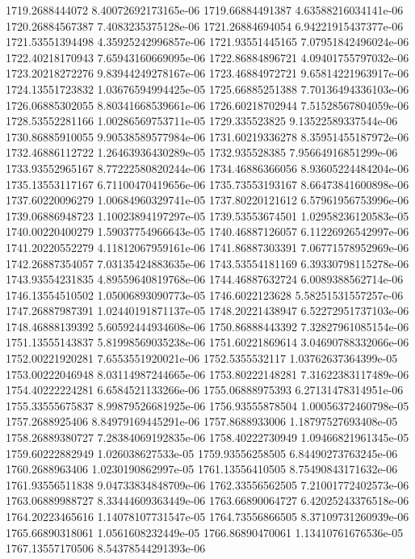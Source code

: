 {1719.2688444072 8.40072692173165e-06
1719.66884491387 4.63588216034141e-06
1720.26884567387 7.4083235375128e-06
1721.26884694054 6.94221915437377e-06
1721.53551394498 4.35925242996857e-06
1721.93551445165 7.07951842496024e-06
1722.40218170943 7.65943160669095e-06
1722.86884896721 4.09401755797032e-06
1723.20218272276 9.83944249278167e-06
1723.46884972721 9.65814221963917e-06
1724.13551723832 1.03676594994425e-05
1725.66885251388 7.70136494336103e-06
1726.06885302055 8.80341668539661e-06
1726.60218702944 7.51528567804059e-06
1728.53552281166 1.00286569753711e-05
1729.335523825 9.13522589337544e-06
1730.86885910055 9.90538589577984e-06
1731.60219336278 8.35951455187972e-06
1732.46886112722 1.26463936430289e-05
1732.935528385 7.95664916851299e-06
1733.93552965167 8.77222580820244e-06
1734.46886366056 8.93605224484204e-06
1735.13553117167 6.71100470419656e-06
1735.73553193167 8.66473841600898e-06
1737.60220096279 1.00684960329741e-05
1737.80220121612 6.57961956753996e-06
1739.06886948723 1.10023894197297e-05
1739.53553674501 1.02958236120583e-05
1740.00220400279 1.59037754966643e-05
1740.46887126057 6.11226926542997e-06
1741.20220552279 4.11812067959161e-06
1741.86887303391 7.06771578952969e-06
1742.26887354057 7.03135424883635e-06
1743.53554181169 6.39330798115278e-06
1743.93554231835 4.89559640819768e-06
1744.46887632724 6.0089388562714e-06
1746.13554510502 1.05006893090773e-05
1746.6022123628 5.58251531557257e-06
1747.26887987391 1.02440191871137e-05
1748.20221438947 6.52272951737103e-06
1748.46888139392 5.60592444934608e-06
1750.86888443392 7.32827961085154e-06
1751.13555143837 5.81998569035238e-06
1751.60221869614 3.04690788332066e-06
1752.00221920281 7.6553551920021e-06
1752.5355532117 1.03762637364399e-05
1753.00222046948 8.03114987244665e-06
1753.80222148281 7.31622383117489e-06
1754.40222224281 6.6584521133266e-06
1755.06888975393 6.27131478314951e-06
1755.33555675837 8.99879526681925e-06
1756.93555878504 1.00056372460798e-05
1757.2688925406 8.84979169445291e-06
1757.8688933006 1.18797527693408e-05
1758.26889380727 7.28384069192835e-06
1758.40222730949 1.09466821961345e-05
1759.60222882949 1.026038627533e-05
1759.93556258505 6.84490273763245e-06
1760.2688963406 1.0230190862997e-05
1761.13556410505 8.75490843171632e-06
1761.93556511838 9.04733834848709e-06
1762.33556562505 7.21001772402573e-06
1763.06889988727 8.33444609363449e-06
1763.66890064727 6.42025243376518e-06
1764.20223465616 1.14078107731547e-05
1764.73556866505 8.37109731260939e-06
1765.66890318061 1.0561608232449e-05
1766.86890470061 1.13410761676536e-05
1767.13557170506 8.54378544291393e-06
}
